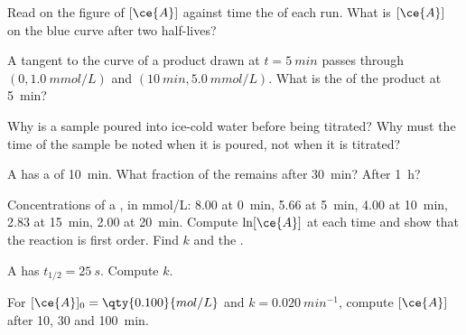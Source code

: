 \begin{exercise}[$\star$]\label{exo:g12:reaction-rates:2}
Read on the figure of $[\ce{A}]$ against time the  of each run.
What is $[\ce{A}]$ on the blue curve after two half-lives?
\end{exercise}

\begin{exercise}[$\star$]\label{exo:g12:reaction-rates:3}
A tangent to the curve of a product drawn at $t = \qty{5}{min}$ passes
through $(0, \qty{1.0}{mmol/L})$ and $(\qty{10}{min}, \qty{5.0}{mmol/L})$.
What is the  of the product at \qty{5}{min}?
\end{exercise}

\begin{exercise}[$\star$]\label{exo:g12:reaction-rates:4}
Why is a sample poured into ice-cold water before being titrated? Why
must the time of the sample be noted when it is poured, not when it is
titrated?
\end{exercise}

\begin{exercise}[$\star$]\label{exo:g12:reaction-rates:5}
A  has a  of \qty{10}{min}. What fraction of
the  remains after \qty{30}{min}? After \qty{1}{h}?
\end{exercise}

\begin{exercise}[$\star\star$]\label{exo:g12:reaction-rates:6}
Concentrations of a , in \si{mmol/L}: 8.00 at \qty{0}{min}, 5.66
at \qty{5}{min}, 4.00 at \qty{10}{min}, 2.83 at \qty{15}{min}, 2.00 at
\qty{20}{min}. Compute $\ln[\ce{A}]$ at each time and show that the
reaction is first order. Find $k$ and the .
\end{exercise}

\begin{exercise}[$\star\star$]\label{exo:g12:reaction-rates:7}
A  has $t_{1/2} = \qty{25}{s}$. Compute $k$.
\end{exercise}

\begin{exercise}[$\star\star$]\label{exo:g12:reaction-rates:8}
For $[\ce{A}]_0 = \qty{0.100}{mol/L}$ and $k = \qty{0.020}{min^{-1}}$,
compute $[\ce{A}]$ after 10, 30 and \qty{100}{min}.
\end{exercise}


